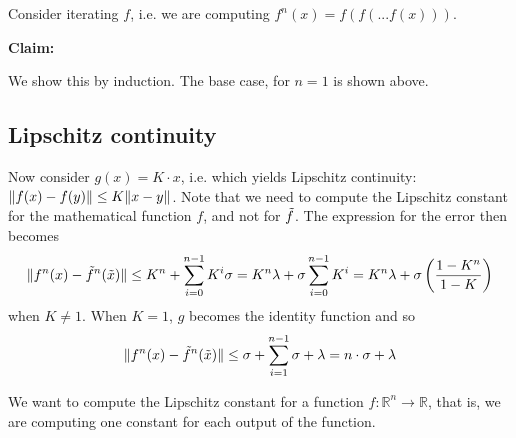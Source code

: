 

Consider iterating $f$, i.e. we are computing $f^n(x) = f(f(...f(x)))$.

{\bf Claim: }

We show this by induction. The base case, for $n = 1$ is shown above.



\subsection{Lipschitz continuity}
Now consider $g(x) = K \cdot x$, i.e. which yields Lipschitz continuity:
$\lVert f(x) - f(y) \rVert \le K \lVert x - y \rVert$.
Note that we need to compute the Lipschitz constant for the mathematical function $f$,
and not for $\tilde{f}$.
The expression for the error then becomes
\begin{align}
\lVert f^n(x) - \tilde{f}^n(\tilde{x})\rVert \le K^n + \sum^{n-1}_{i=0}K^i \sigma
  = K^n \lambda + \sigma \sum^{n-1}_{i=0} K^i
  = K^n \lambda + \sigma \left(\dfrac{1 - K^n}{1-K} \right)
\end{align}
when $K \ne 1$.
When $K = 1$, $g$ becomes the identity function and so
\begin{align}
\lVert f^n(x) - \tilde{f}^n(\tilde{x})\rVert \le \sigma + \sum^{n-1}_{i=1}\sigma + \lambda
= n \cdot \sigma + \lambda
\end{align}

We want to compute the Lipschitz constant for a function $f: \mathbb{R}^n \to \mathbb{R}$,
that is, we are computing one constant for each output of the function.

